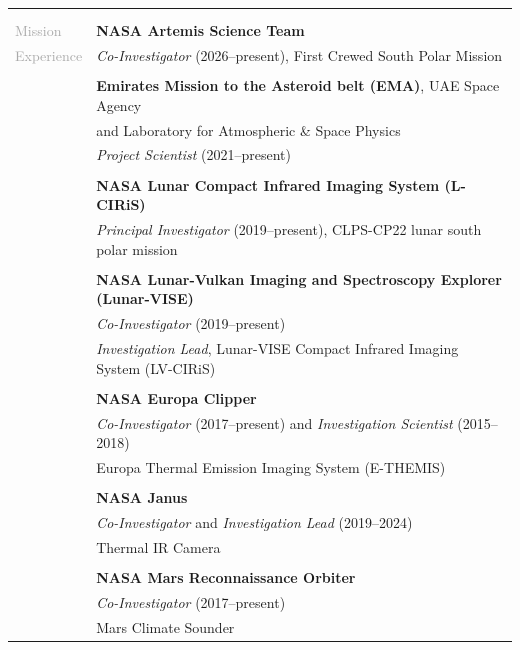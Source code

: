 \documentclass[letterpaper,10pt,twoside]{article}
\begin{document}
\begin{tabular}{@{} l l}
     & \\
     & \\
 \large{\textcolor{darkgray}{Mission}}    & \textbf{NASA Artemis Science Team}\\
 \large{\textcolor{darkgray}{Experience}} & \textit{Co-Investigator} (2026--present), First Crewed South Polar Mission\\
     & \\
     & \textbf{Emirates Mission to the Asteroid belt (EMA)}, UAE Space Agency\\
     & and Laboratory for Atmospheric \& Space Physics \\
     & \textit{Project Scientist} (2021--present)\\
     & \\
     & \textbf{NASA Lunar Compact Infrared Imaging System (L-CIRiS)}\\
     & \textit{Principal Investigator} (2019--present), CLPS-CP22 lunar south polar mission\\
     & \\
     & \textbf{NASA Lunar-Vulkan Imaging and Spectroscopy Explorer (Lunar-VISE)}\\
     & \textit{Co-Investigator} (2019--present)\\
     & \textit{Investigation Lead}, Lunar-VISE Compact Infrared Imaging System (LV-CIRiS)\\
     & \\
     & \textbf{NASA Europa Clipper}\\
     & \textit{Co-Investigator} (2017--present) and \textit{Investigation Scientist} (2015--2018)\\
     & Europa Thermal Emission Imaging System (E-THEMIS)\\
     & \\
     & \textbf{NASA Janus}\\
     & \textit{Co-Investigator} and \textit{Investigation Lead} (2019--2024)\\
     & Thermal IR Camera\\
     &\\
     & \textbf{NASA Mars Reconnaissance Orbiter} \\
     & \textit{Co-Investigator} (2017--present) \\
     & Mars Climate Sounder \\
\end{tabular}

\end{document}
